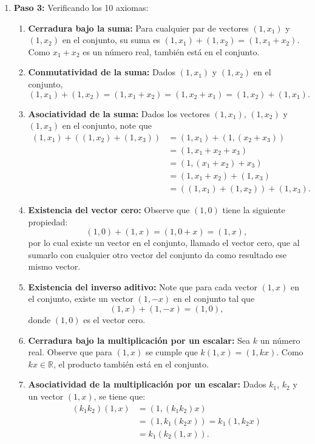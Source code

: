 \begin{example}
\begin{myproof}
\begin{enumerate}[$(a)$]
\item \textbf{Paso 3:} Verificando los 10 axiomas:
\begin{enumerate}[$1.$]
\item \textbf{Cerradura bajo la suma:} Para cualquier par de vectores $(1,x_1)$ y $(1,x_2)$ en el conjunto, su suma es $(1,x_1)+(1,x_2)=(1,x_1+x_2)$. Como $x_1+x_2$ es un número real, también está en el conjunto.

\item \textbf{Conmutatividad de la suma:} Dados $(1,x_1)$ y $(1,x_2)$ en el conjunto, 
$$(1,x_1)+(1,x_2) = (1,x_1+x_2) = (1,x_2+x_1) = (1,x_2)+(1,x_1).$$

\item \textbf{Asociatividad de la suma:} Dados los vectores $(1,x_1)$, $(1,x_2)$ y $(1,x_3)$ en el conjunto, note que
\begin{align*}
(1,x_1)+((1,x_2)+(1,x_3))&= (1,x_1)+(1,(x_2+x_3))\\
&=(1,x_1+x_2+x_3)\\
&=(1,(x_1+x_2)+x_3)\\
&=(1,x_1+x_2)+(1,x_3)\\
&=((1,x_1)+(1,x_2))+(1,x_3).
\end{align*}

\item \textbf{Existencia del vector cero:} Observe que $(1,0)$ tiene la siguiente propiedad: 
$$(1,0)+(1,x)=(1,0+x)=(1,x),$$
por lo cual existe un vector en el conjunto, llamado el vector cero, que al sumarlo con cualquier otro vector del conjunto da como resultado ese mismo vector.

\item \textbf{Existencia del inverso aditivo:} Note que para cada vector $(1,x)$ en el conjunto, existe un vector $(1,-x)$ en el conjunto tal que 
$$(1,x)+(1,-x)=(1,0),$$
donde $(1,0)$ es el vector cero.

\item \textbf{Cerradura bajo la multiplicación por un escalar:} Sea $k$ un número real. Observe que para $(1,x)$ se cumple que $k(1,x)=(1,kx)$. Como $kx\in \mathbb{R}$, el producto también está en el conjunto.

\item \textbf{Asociatividad de la multiplicación por un escalar:} Dados $k_1$, $k_2$ y un vector $(1,x)$, se tiene que: 
\begin{align*}
(k_1k_2)(1,x) &= (1,(k_1k_2)x)\\
&=(1,k_1(k_2x))=k_1(1,k_2x)\\
&=k_1(k_2(1,x)).
\end{align*}


\end{enumerate}
\end{enumerate}
\end{myproof}
\end{example}
